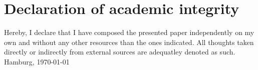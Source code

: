 \chapter*{Declaration of academic integrity}
Hereby, I declare that I have composed the presented paper independently on my own and without any other resources than the ones indicated. All thoughts taken directly or indirectly from external sources are adequatley denoted as such.
\\[2em]
Hamburg, \today
\\[8em]
\theauthor

\newpage